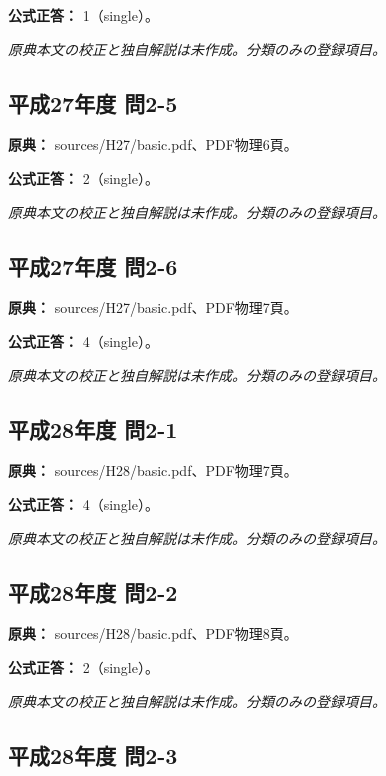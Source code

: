 \textbf{公式正答：} 1（single）。

\par\textit{原典本文の校正と独自解説は未作成。分類のみの登録項目。}

\subsection{平成27年度 問2-5}
\label{q:h27-reg-basic-2-5}

\noindent\textbf{原典：} sources/H27/basic.pdf、PDF物理6頁。

\textbf{公式正答：} 2（single）。

\par\textit{原典本文の校正と独自解説は未作成。分類のみの登録項目。}

\subsection{平成27年度 問2-6}
\label{q:h27-reg-basic-2-6}

\noindent\textbf{原典：} sources/H27/basic.pdf、PDF物理7頁。

\textbf{公式正答：} 4（single）。

\par\textit{原典本文の校正と独自解説は未作成。分類のみの登録項目。}

\subsection{平成28年度 問2-1}
\label{q:h28-reg-basic-2-1}

\noindent\textbf{原典：} sources/H28/basic.pdf、PDF物理7頁。

\textbf{公式正答：} 4（single）。

\par\textit{原典本文の校正と独自解説は未作成。分類のみの登録項目。}

\subsection{平成28年度 問2-2}
\label{q:h28-reg-basic-2-2}

\noindent\textbf{原典：} sources/H28/basic.pdf、PDF物理8頁。

\textbf{公式正答：} 2（single）。

\par\textit{原典本文の校正と独自解説は未作成。分類のみの登録項目。}

\subsection{平成28年度 問2-3}
\label{q:h28-reg-basic-2-3}

